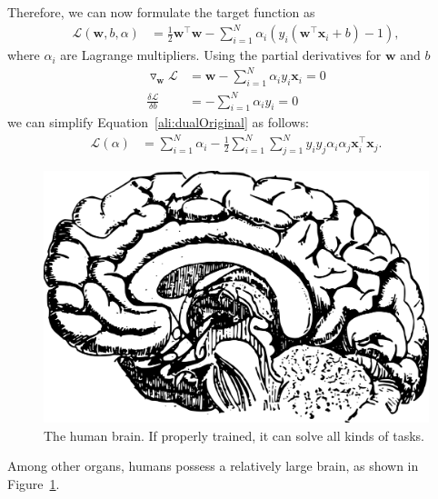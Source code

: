 \documentclass[american, a4paper, 12pt]{scrartcl}
\newcommand\randomtext[1]{\textcolor{gray!80}{\lipsum[#1]}}
\begin{document}
\randomtext{8}


%

Therefore, we can now formulate the target function as
\begin{align}
    \mathcal{L}(\mathbf{w},b,\alpha)&=\frac{1}{2}\mathbf{w}^\intercal\mathbf{w}-
    \sum_{i=1}^N\alpha_i(y_i(\mathbf{w}^\intercal\mathbf{x}_i+b)-1), %
    \label{ali:dualOriginal}
\end{align}
where $\alpha_i$ are Lagrange multipliers. Using the partial derivatives for $\mathbf{w}$ and
$b$
\begin{align*}
    \triangledown_\mathbf{w}\mathcal{L}&=\mathbf{w}-\sum_{i=1}^N\alpha_iy_i\mathbf{x}_i=0\\
    \frac{\delta\mathcal{L}}{\delta b}&=-\sum_{i=1}^N\alpha_iy_i=0
\end{align*}
we can simplify Equation~\ref{ali:dualOriginal} as follows:
\begin{align*}
    \mathcal{L}(\alpha)&=\sum_{i=1}^N\alpha_i-\frac{1}{2}\sum_{i=1}^N\sum_{j=1}^Ny_iy_j
    \alpha_i\alpha_j\mathbf{x}_i^\intercal\mathbf{x}_j. %
\end{align*}

\randomtext{9-11}



\begin{figure}[tp]
    \centering
    \includegraphics[width=.4\linewidth]{gfx/public_domain_brain.pdf}
    \caption{
        The human brain. If properly trained, it can solve all kinds of tasks.
    }
    \label{fig:brain}
\end{figure}
Among other organs, humans possess a relatively large brain, as shown in
Figure~\ref{fig:brain}. \randomtext{12}
\end{document}
